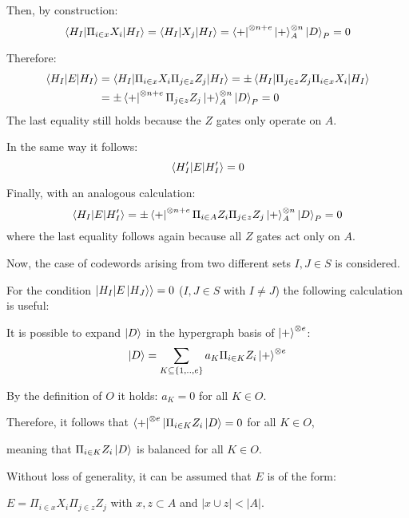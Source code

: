 \documentclass[12pt]{iopart}
\begin{document}
Then, by construction:
\begin{equation}
\braket{H_I|\Pi_{i \in x} X_i|H_I} = \braket{H_I|X_j|H_I} = \bra{+}^{\otimes n + e}\ket{+}^{\otimes n}_A\ket{D}_P = 0
\end{equation} 

Therefore:
\begin{eqnarray}
\braket{H_I|E|H_I} &= \braket{H_I|\Pi_{i \in x} X_i \Pi_{j \in z} Z_j|H_I} = \pm \braket{H_I| \Pi_{j \in z} Z_j \Pi_{i \in x} X_i|H_I} \nonumber \\
&= \pm \bra{+}^{\otimes n + e}\Pi_{j \in z} Z_j\ket{+}^{\otimes n}_A\ket{D}_P = 0
\end{eqnarray}
The last equality still holds because the $Z$ gates only operate on $A$.

In the same way it follows:
\begin{equation}
\braket{H_I^\prime|E|H_I^\prime} = 0
\end{equation}

Finally, with an analogous calculation:
\begin{equation}
\braket{H_I|E|H_I^\prime} = \pm \bra{+}^{\otimes n + e}\Pi_{i \in A} Z_i\Pi_{j \in z} Z_j\ket{+}^{\otimes n}_A\ket{D}_P = 0
\end{equation}
where the last equality follows again because all $Z$ gates act only on $A$.

Now, the case of codewords arising from two different sets $I,J \in S$ is considered.

For the condition $\ket{H_I|E\ket{H_J}} = 0$ ($I,J \in S$ with $I \neq J$) the following calculation is useful:

It is possible to expand $\ket{D}$ in the hypergraph basis of $\ket{+}^{\otimes e}$:
\begin{equation}
\ket{D} = \sum_{K \subseteq \{1,..,e\}} a_K \Pi_{i \in K} Z_i \ket{+}^{\otimes e}
\end{equation}

By the definition of $O$ it holds: $a_K = 0$ for all $K \in O$.

Therefore, it follows that $\bra{+}^{\otimes e}| \Pi_{i \in K} Z_i \ket{D} = 0$ for all $K \in O$,

meaning that $\Pi_{i \in K} Z_i \ket{D}$ is balanced for all $K \in O$.

Without loss of generality, it can be assumed that $E$ is of the form:

$E = \Pi_{i \in x} X_i \Pi_{j \in z} Z_j$ with $x,z \subset A$ and $|x \cup z| < |A|$. 
\end{document}
